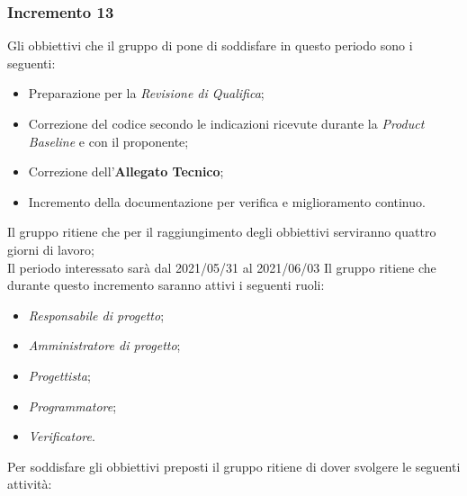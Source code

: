 \subsubsection{Incremento 13}
Gli obbiettivi che il gruppo di pone di soddisfare in questo periodo sono i seguenti:
\begin{itemize}
    \item Preparazione per la \textit{Revisione di Qualifica};
    \item Correzione del codice secondo le indicazioni ricevute durante la \textit{Product Baseline} e con il proponente;
    \item Correzione dell'\textbf{Allegato Tecnico};
    \item Incremento della documentazione per verifica e miglioramento continuo.
\end{itemize}
Il gruppo ritiene che per il raggiungimento degli obbiettivi serviranno quattro giorni di lavoro;\\
Il periodo interessato sarà dal 2021/05/31 al 2021/06/03
Il gruppo ritiene che durante questo incremento saranno attivi i seguenti ruoli:
\begin{itemize}
    \item \textit{Responsabile di progetto};
    \item \textit{Amministratore di progetto};
    \item \textit{Progettista};
    \item \textit{Programmatore};
    \item \textit{Verificatore}.
\end{itemize}
Per soddisfare gli obbiettivi preposti il gruppo ritiene di dover svolgere le seguenti attività:
